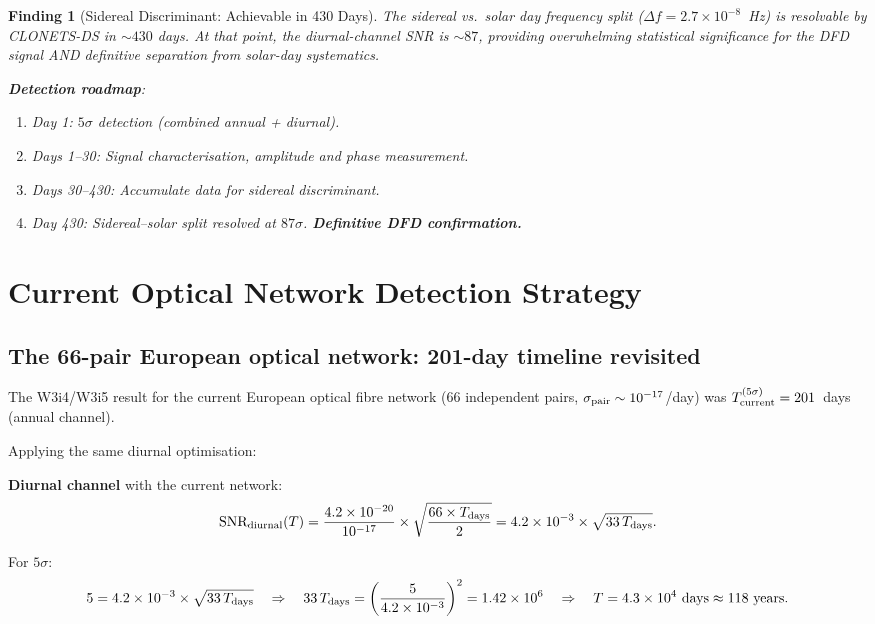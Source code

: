 \documentclass[11pt]{article}
\newtheorem{finding}{Finding}
\newcommand{\ee}[1]{\times 10^{#1}}
\begin{document}
\begin{finding}[Sidereal Discriminant: Achievable in 430 Days]
\label{find:sidereal-430}
The sidereal vs.\ solar day frequency split ($\Delta f = 2.7\ee{-8}$~Hz)
is resolvable by CLONETS-DS in $\sim 430$ days. At that point, the
diurnal-channel SNR is $\sim 87$, providing overwhelming statistical
significance for the DFD signal AND definitive separation from solar-day
systematics.

\textbf{Detection roadmap}:
\begin{enumerate}[nosep]
\item Day 1: $5\sigma$ detection (combined annual + diurnal).
\item Days 1--30: Signal characterisation, amplitude and phase measurement.
\item Days 30--430: Accumulate data for sidereal discriminant.
\item Day 430: Sidereal--solar split resolved at $87\sigma$.
  \textbf{Definitive DFD confirmation.}
\end{enumerate}
\end{finding}

\section{Current Optical Network Detection Strategy}
\label{sec:current-network}

\subsection{The 66-pair European optical network: 201-day timeline revisited}

The W3i4/W3i5 result for the current European optical fibre network
(66 independent pairs, $\sigma_{\rm pair} \sim 10^{-17}$/day) was
$T^{(5\sigma)}_{\rm current} = 201$~days (annual channel).

Applying the same diurnal optimisation:

\textbf{Diurnal channel} with the current network:
\begin{equation}
\text{SNR}_{\rm diurnal}(T) = \frac{4.2\ee{-20}}{10^{-17}}
\times\sqrt{\frac{66\times T_{\rm days}}{2}}
= 4.2\ee{-3}\times\sqrt{33\,T_{\rm days}}.
\end{equation}

For $5\sigma$:
\begin{equation}
5 = 4.2\ee{-3}\times\sqrt{33\,T_{\rm days}}
\quad\Rightarrow\quad
33\,T_{\rm days} = \left(\frac{5}{4.2\ee{-3}}\right)^2 = 1.42\ee{6}
\quad\Rightarrow\quad
T = 4.3\ee{4}~\text{days} \approx 118~\text{years.}
\end{equation}
\end{document}
